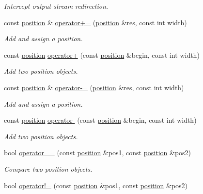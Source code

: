 \begin{DoxyCompactItemize}
\begin{DoxyCompactList}\small\item\em Intercept output stream redirection. \end{DoxyCompactList}\item 
const \hyperlink{classyy_1_1position}{position} \& \hyperlink{namespaceyy_aca369d44a16c9c73bdcbbf4966ec4675}{operator+=} (\hyperlink{classyy_1_1position}{position} \&res, const int width)
\begin{DoxyCompactList}\small\item\em Add and assign a position. \end{DoxyCompactList}\item 
const \hyperlink{classyy_1_1position}{position} \hyperlink{namespaceyy_a26f5ab7d06a8b08b7fb9171e90ad87d7}{operator+} (const \hyperlink{classyy_1_1position}{position} \&begin, const int width)
\begin{DoxyCompactList}\small\item\em Add two position objects. \end{DoxyCompactList}\item 
const \hyperlink{classyy_1_1position}{position} \& \hyperlink{namespaceyy_a26552e3cfc333fb6b3cf933e1d54e724}{operator-\/=} (\hyperlink{classyy_1_1position}{position} \&res, const int width)
\begin{DoxyCompactList}\small\item\em Add and assign a position. \end{DoxyCompactList}\item 
const \hyperlink{classyy_1_1position}{position} \hyperlink{namespaceyy_a870347901bc2465a095864610c9d04b1}{operator-\/} (const \hyperlink{classyy_1_1position}{position} \&begin, const int width)
\begin{DoxyCompactList}\small\item\em Add two position objects. \end{DoxyCompactList}\item 
bool \hyperlink{namespaceyy_a30a61b0569cd2c9ea4ae16eb4994c7b3}{operator==} (const \hyperlink{classyy_1_1position}{position} \&pos1, const \hyperlink{classyy_1_1position}{position} \&pos2)
\begin{DoxyCompactList}\small\item\em Compare two position objects. \end{DoxyCompactList}\item 
bool \hyperlink{namespaceyy_abf91f5a379cf9f8c8be94f650c48c06c}{operator!=} (const \hyperlink{classyy_1_1position}{position} \&pos1, const \hyperlink{classyy_1_1position}{position} \&pos2)

\end{DoxyCompactItemize}
